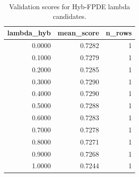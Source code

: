 \begin{table}[t]
\caption{Validation scores for Hyb-FPDE lambda candidates.}
\label{tab:lambda_distribution_computed}
\centering
\begin{tabular}{rrr}
\toprule
lambda\_hyb & mean\_score & n\_rows \\
\midrule
0.0000 & 0.7282 & 1 \\
0.1000 & 0.7279 & 1 \\
0.2000 & 0.7285 & 1 \\
0.3000 & 0.7290 & 1 \\
0.4000 & 0.7290 & 1 \\
0.5000 & 0.7288 & 1 \\
0.6000 & 0.7283 & 1 \\
0.7000 & 0.7278 & 1 \\
0.8000 & 0.7271 & 1 \\
0.9000 & 0.7268 & 1 \\
1.0000 & 0.7244 & 1 \\
\bottomrule
\end{tabular}

\end{table}
